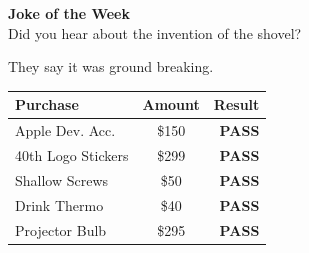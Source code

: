 \documentclass[9pt]{extarticle} %
\begin{document}
\begin{minipage}[t]{.35\linewidth}
\begin{mdframed}[style=sidebar,frametitle={}]
\textbf{Joke of the Week} \\
	Did you hear about the invention of the shovel?
	
	They say it was ground breaking.
\\



\begin{tabular}{lcr}

Purchase & Amount & Result \\
\midrule
Apple Dev. Acc. & \$150 & \textbf{PASS} \\
\midrule
40th Logo Stickers & \$299 & \textbf{PASS} \\
\midrule
Shallow Screws & \$50 & \textbf{PASS}\\
\midrule
Drink Thermo & \$40 & \textbf{PASS} \\ 
\midrule
Projector Bulb & \$295 & \textbf{PASS} \\

\bottomrule
\end{tabular}


\end{mdframed}
\end{minipage}\hfill %
%
%
\end{document}
